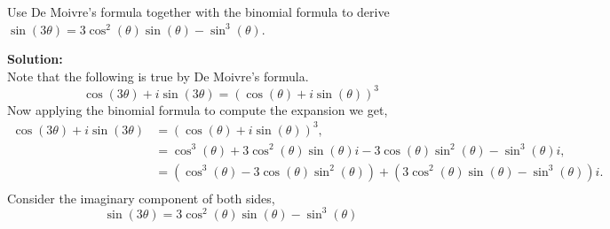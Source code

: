 \documentclass[12pt]{article}
\makeatletter
\theoremstyle{homework}
\newenvironment{exercise}[1]
{\def\@currentlabel{#1}\exercisecore}
{\endexercisecore}
\newcommand{\localhead}[1]{\par\smallskip\noindent\textbf{#1}\nobreak\\}%
\newcommand\solution{\localhead{Solution:}}
\makeatother
\begin{document}
\begin{exercise}{12a} Use De Moivre's formula together with the binomial formula to derive $\sin(3\theta) = 3\cos^2(\theta)\sin(\theta) - \sin^3(\theta)$.\\
    \solution Note that the following is true by De Moivre's formula. 
    \begin{equation*}
        \cos(3\theta) + i\sin(3\theta) = (\cos(\theta) + i\sin(\theta))^3
    \end{equation*} 
    Now applying the binomial formula to compute the expansion we get, 
    \begin{align*}
        \cos(3\theta) + i\sin(3\theta) &= (\cos(\theta) + i\sin(\theta))^3,\\
         &= \cos^3(\theta) + 3\cos^2(\theta)\sin(\theta)i - 3\cos(\theta)\sin^2(\theta) - \sin^3(\theta)i,\\
         &= (\cos^3(\theta) - 3\cos(\theta)\sin^2(\theta)) + (3\cos^2(\theta)\sin(\theta) - \sin^3(\theta))i.\\ 
    \end{align*} 
    Consider the imaginary component of both sides,
    \begin{equation*}
        \sin(3\theta) = 3\cos^2(\theta)\sin(\theta) - \sin^3(\theta)
    \end{equation*}
\end{exercise}
\vspace{.15in}
\end{document}
